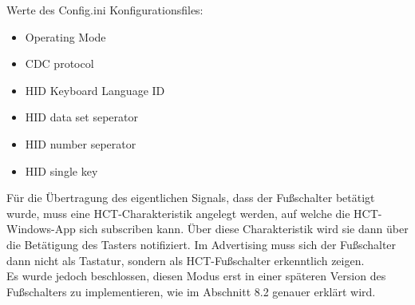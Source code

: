 Werte des Config.ini Konfigurationsfiles:
\begin{itemize}
	\item Operating Mode 
	\item CDC protocol 
	\item HID Keyboard Language ID 
	\item HID data set seperator 
	\item HID number seperator
	\item HID single key 
\end{itemize}

Für die Übertragung des eigentlichen Signals, dass der Fußschalter betätigt wurde, muss eine HCT-Charakteristik angelegt werden, auf welche die HCT-Windows-App sich subscriben kann. Über diese Charakteristik wird sie dann über die Betätigung des Tasters notifiziert. Im Advertising muss sich der Fußschalter dann nicht als Tastatur, sondern als HCT-Fußschalter erkenntlich zeigen.\\
Es wurde jedoch beschlossen, diesen Modus erst in einer späteren Version des Fußschalters zu implementieren, wie im Abschnitt 8.2 genauer erklärt wird.